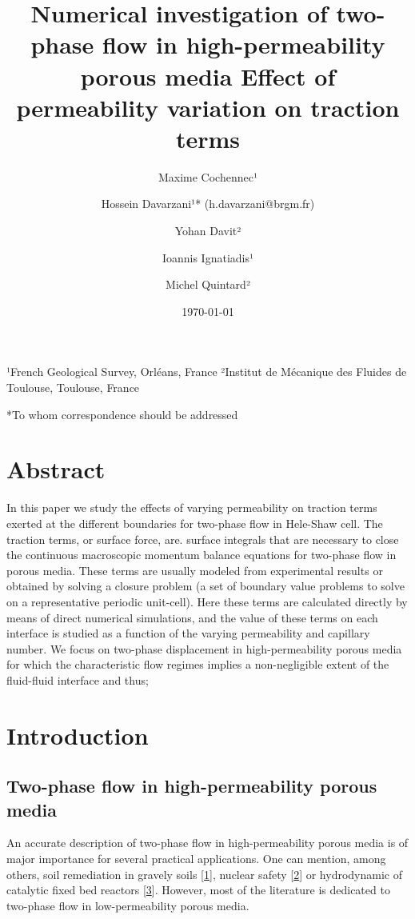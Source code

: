 \documentclass[]{article}
\title{Numerical investigation of two-phase flow in high-permeability porous
media Effect of permeability variation on traction terms}
\author{Maxime Cochennec¹ \and Hossein Davarzani¹* (h.davarzani@brgm.fr) \and Yohan Davit² \and Ioannis Ignatiadis¹ \and Michel Quintard²}
\date{\today{}}
\begin{document}
\maketitle

¹French Geological Survey, Orléans, France ²Institut de Mécanique des
Fluides de Toulouse, Toulouse, France

*To whom correspondence should be addressed


\hypertarget{abstract}{%
\section{Abstract}\label{abstract}}

In this paper we study the effects of varying permeability on traction
terms exerted at the different boundaries for two-phase flow in
Hele-Shaw cell. The traction terms, or surface force, are. surface
integrals that are necessary to close the continuous macroscopic
momentum balance equations for two-phase flow in porous media. These
terms are usually modeled from experimental results or obtained by
solving a closure problem (a set of boundary value problems to solve on
a representative periodic unit-cell). Here these terms are calculated
directly by means of direct numerical simulations, and the value of
these terms on each interface is studied as a function of the varying
permeability and capillary number. We focus on two-phase displacement in
high-permeability porous media for which the characteristic flow regimes
implies a non-negligible extent of the fluid-fluid interface and thus;

\hypertarget{introduction}{%
\section{Introduction}\label{introduction}}

\hypertarget{two-phase-flow-in-high-permeability-porous-media}{%
\subsection{Two-phase flow in high-permeability porous
media}\label{two-phase-flow-in-high-permeability-porous-media}}

An accurate description of two-phase flow in high-permeability porous
media is of major importance for several practical applications. One can
mention, among others, soil remediation in gravely soils
{[}\protect\hyperlink{ref-fetter2017contaminant}{1}{]}, nuclear safety
{[}\protect\hyperlink{ref-clavier2017modeling}{2}{]} or hydrodynamic of
catalytic fixed bed reactors
{[}\protect\hyperlink{ref-Santos1991}{3}{]}. However, most of the
literature is dedicated to two-phase flow in low-permeability porous
media.
\end{document}
